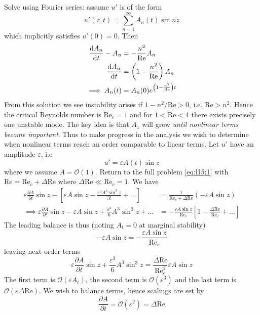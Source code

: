 \documentclass{jknotes}
\newcommand{\ReN}{\text{Re}}
\newcommand{\veps}{\varepsilon}
\begin{document}
Solve using Fourier series: assume $u'$ is of the form
\begin{equation}
	u'(z,t) = \sum_{n=1}^\infty A_n(t)\sin nz
\end{equation}
which implicitly satisfies $u'(0) = 0$. Then
\begin{align}
	\frac{\diffd A_n}{\diffd t} - A_n &= -\frac{n^2}{\ReN} A_n \\
	\frac{\diffd A_n}{\diffd t} &= \left(1-\frac{n^2}{\ReN}\right) A_n \\
	\implies A_n(t) &= A_n(0)e^{\left(1-\frac{n^2}{\ReN}\right)t}
\end{align}
From this solution we see instability arises if $1-n^2/\ReN > 0$, i.e. $\ReN >
n^2$. Hence the critical Reynolds number is $\ReN_c = 1$ and for $1 < \ReN < 4$
there exists precisely one unstable mode. The key idea is that $A_1$ will grow
\emph{until nonlinear terms become important}. Thus to make progress in the
analysis we wish to determine when nonlinear terms reach an order comparable to
linear terms. Let $u'$ have an amplitude $\veps$, i.e
\begin{equation}
	u' = \veps A(t) \sin z
\end{equation}
where we assume $A = \mathcal{O}(1)$. Return to the full problem
\eqref{eq:l15:1} with $\ReN = \ReN_c + \Delta \ReN$ where $\Delta \ReN \ll
\ReN_c = 1$. We have
\begin{align}
	\veps \frac{\partial A}{\partial t} \sin z - \left[ \veps A \sin z -
	\frac{\veps^3 A^3 \sin^3 z}{3!} + \dots\right]
	&= \frac{1}{\ReN_c + \Delta \ReN}\left(-\veps A \sin z\right) \\
	\implies \veps \frac{\partial A}{\partial t} \sin z - \veps A \sin z +
	\frac{\veps^3}{6}A^3 \sin^3 z + \dots &= -\frac{\veps A \sin
	z}{\ReN_c}\left[1-\frac{\Delta \ReN}{\ReN_c} + \dots \right] 
\end{align}
The leading balance is thus (noting $A_t = 0$ at marginal stability)
\begin{equation}
	-\veps A \sin z = -\frac{\veps A \sin z}{\ReN_c}
\end{equation}
leaving next order terms
\begin{equation}
	\veps \frac{\partial A}{\partial t} \sin z + \frac{\veps^3}{6}A^3 \sin^3 z
	= \frac{\Delta \ReN}{\ReN_c^2} \veps A \sin z
\end{equation}
The first term is $\mathcal{O}(\veps A_t)$, the second term is
$\mathcal{O}(\veps^3)$ and the last term is $\mathcal{O}(\veps\Delta \ReN)$.
We wish to balance terms, hence scalings are set by
\begin{equation}
	\frac{\partial A}{\partial t} = \mathcal{O}(\veps^2) = \Delta \ReN
\end{equation}
\end{document}
